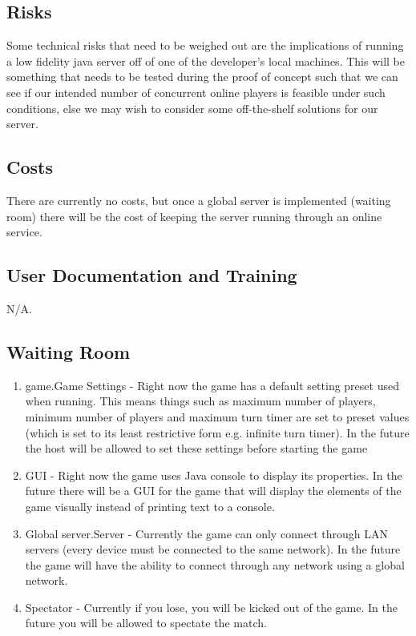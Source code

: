 \documentclass[12pt, titlepage]{article}
\begin{document}
\subsection{Risks}
Some technical risks that need to be weighed out are the implications of running a low fidelity java server off of one of the developer's local machines. This will be something that needs to be tested during the proof of concept such that we can see if our intended number of concurrent online players is feasible under such conditions, else we may wish to consider some off-the-shelf solutions for our server. 

\subsection{Costs}
There are currently no costs, but once a global server is implemented (waiting room) there will be the cost of keeping the server running through an online service.

\subsection{User Documentation and Training}
N/A.
\subsection{Waiting Room}
\begin{enumerate}
    \item game.Game Settings - Right now the game has a default setting preset used when running. This means things such as maximum number of players, minimum number of players and maximum turn timer are set to preset values (which is set to its least restrictive form e.g. infinite turn timer). In the future the host will be allowed to set these settings before starting the game
    
    \item GUI - Right now the game uses Java console to display its properties. In the future there will be a GUI for the game that will display the elements of the game visually instead of printing text to a console. 
    
    \item Global server.Server - Currently the game can only connect through LAN servers (every device must be connected to the same network). In the future the game will have the ability to connect through any network using a global network.
    
    \item Spectator - Currently if you lose, you will be kicked out of the game. In the future you will be allowed to spectate the match.

\end{enumerate}
    
\end{document}
